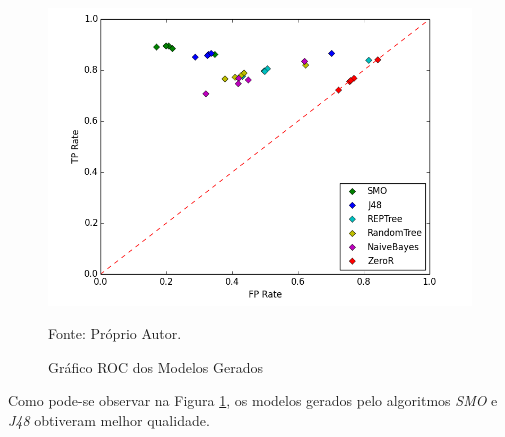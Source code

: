 \documentclass[
	12pt,				%
	openright,			%
	oneside,	
	a4paper,				%
	english,				%
	brazil				%
]{abntex2/abntex2} %
\begin{document}
	\pagebreak
	\clearpage
	\newpage
	\begin{figure}[!htb]
		\caption{\label{figTodosModelos} Gráfico ROC dos Modelos Gerados}
		\begin{center}
			\includegraphics[scale=0.8]{python/TodosModelos.png}
		\end{center}
		Fonte: Próprio Autor.
	\end{figure}

	Como pode-se observar na Figura \ref{figTodosModelos}, os modelos gerados pelo algoritmos \textit{SMO} e \textit{J48} obtiveram melhor qualidade.
\end{document}
